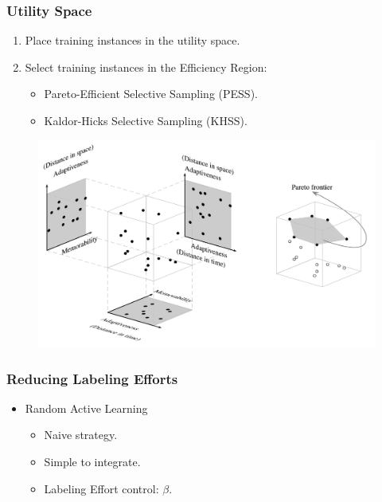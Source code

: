 \documentclass[14pt]{beamer}
\begin{document}
\begin{frame}\frametitle{Utility Space}

\begin{enumerate}
\item Place training instances in the utility space.
\item Select training instances in the Efficiency Region:
\begin{itemize}
\item Pareto-Efficient Selective Sampling (PESS).
\item Kaldor-Hicks Selective Sampling (KHSS).
\end{itemize}
\end{enumerate}

\vspace{-0.1in}
\begin{figure}
\centering
\includegraphics[scale=0.43]{pareto}
\end{figure}

\end{frame}

\begin{frame}\frametitle{Reducing Labeling Efforts}
\begin{itemize}
\item Random Active Learning
\begin{itemize}
\item Naive strategy.
\item Simple to integrate.
\item Labeling Effort control: $\beta$.
\end{itemize}
\end{itemize}
\end{frame}
\end{document}
